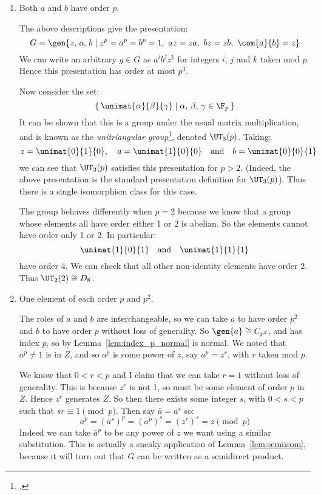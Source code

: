 \begin{enumerate}
    \item Both \(a\) and \(b\) have order \(p\).

        The above descriptions give the presentation:
        \[G = \gen{z,\,a,\,b \mid z^p = a^p = b^p = 1,\ az = za,\ bz = zb,\ \com{a}{b} = z}\]
        We can write an arbitrary \(g \in G\) as \(a^i b^j z^k\) for integers \(i\), \(j\) and \(k\) taken mod \(p\).
        Hence this presentation has order at most \(p^3\).

        Now consider the set:
        \[\left\{\,\unimat{\alpha}{\beta}{\gamma} \mid \alpha,\,\beta,\,\gamma \in \F_p\,\right\}\]
        It can be shown that this is a group under the usual matrix multiplication, and is known as the
        \emph{unitriangular group}\footcite{unitriangular}, denoted \(\UT_3(p)\).
        Taking:
        \[z = \unimat{0}{1}{0}, \quad a = \unimat{1}{0}{0} \quad \text{and} \quad b = \unimat{0}{0}{1}\]
        we can see that \(\UT_3(p)\) satisfies this presentation for \(p > 2\).
        (Indeed, the above presentation is the standard presentation definition for \(\UT_3(p)\)).
        Thus there is a single isomorphism class for this case.

        The group behaves differently when \(p = 2\) because we know that a group whose elements all have order either 1
        or 2 is abelian.
        So the elements cannot have order only 1 or 2.
        In particular:
        \[\unimat{1}{0}{1} \quad \text{and} \quad \unimat{1}{1}{1}\]
        have order 4.
        We can check that all other non-identity elements have order 2.
        Thus \(\UT_2(2) \cong D_8\).

    \item One element of each order \(p\) and \(p^2\).

        The roles of \(a\) and \(b\) are interchangeable, so we can take \(a\) to have order \(p^2\) and \(b\) to have
        order \(p\) without loss of generality.
        So \(\gen{a} \cong C_{p^2}\), and has index \(p\), so by Lemma~\ref{lem:index_p_normal} is normal.
        We noted that \(a^p \neq 1\) is in \(Z\), and so \(a^p\) is some power of \(z\), say \(a^p = z^r\), with \(r\)
        taken mod \(p\).

        We know that \(0 < r < p\) and I claim that we can take \(r = 1\) without loss of generality.
        This is because \(z^r\) is not 1, so must be some element of order \(p\) in \(Z\).
        Hence \(z^r\) generates \(Z\).
        So then there exists some integer \(s\), with \(0 < s < p\) such that \(sr \equiv 1 \pmod{p}\).
        Then say \(\bar{a} = a^s\) so:
        \[\bar{a}^p = {(a^s)}^p = {(a^p)}^s = {(z^r)}^s = z \pmod{p}\]
        Indeed we can take \(\bar{a}^p\) to be any power of \(z\) we want using a similar substitution.
        This is actually a sneaky application of Lemma~\ref{lem:semiisom}, because it will turn out that \(G\) can be
        written as a semidirect product.


\end{enumerate}
